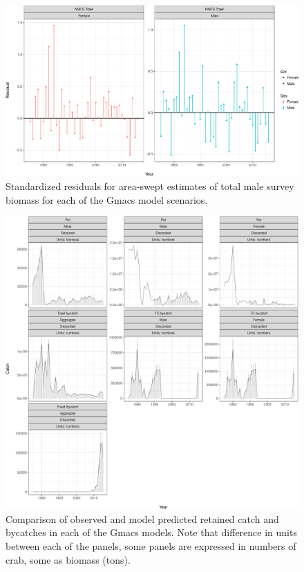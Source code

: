 \documentclass[]{article}
\begin{document}
\newpage

\clearpage

\begin{figure}[htbp]
\centering
\includegraphics{bbrkc_files/figure-latex/bts_resid_nmfs-1.pdf}
\caption{Standardized residuals for area-swept estimates of total male
survey biomass for each of the Gmacs model scenarios.
\label{fig:bts_resid_nmfs}}
\end{figure}

\newpage

\clearpage

\newpage

\clearpage

\begin{figure}[htbp]
\centering
\includegraphics{bbrkc_files/figure-latex/fit_to_catch-1.pdf}
\caption{Comparison of observed and model predicted retained catch and
bycatches in each of the Gmacs models. Note that difference in units
between each of the panels, some panels are expressed in numbers of
crab, some as biomass (tons).\label{fig:fit_to_catch}}
\end{figure}
\end{document}
